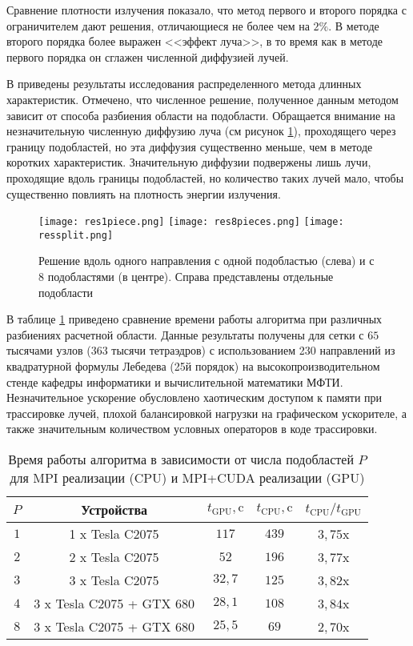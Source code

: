 Сравнение плотности излучения показало, что метод первого и второго порядка с ограничителем дают решения, отличающиеся не более чем на $2\%$. В методе второго порядка более выражен <<эффект луча>>, в то время как в методе первого порядка он сглажен численной диффузией лучей.

В  приведены результаты исследования распределенного метода длинных характеристик. Отмечено, что численное решение, полученное данным методом зависит от способа разбиения области на подобласти. Обращается внимание на незначительную численную диффузию луча (см рисунок \ref{fig:1vs8}), проходящего через границу подобластей, но эта диффузия существенно меньше, чем в методе коротких характеристик. Значительную диффузии подвержены лишь лучи, проходящие вдоль границы подобластей, но количество таких лучей мало, чтобы существенно повлиять на плотность энергии излучения.
\begin{figure}[ht!]
\centering
\texttt{[image: res1piece.png]} %
\texttt{[image: res8pieces.png]} %
\texttt{[image: ressplit.png]} %
\caption{Решение вдоль одного направления с одной подобластью (слева) и с 8 подобластями (в центре). Справа представлены отдельные подобласти}
\label{fig:1vs8}
\end{figure}

В таблице \ref{tab:speedup} приведено сравнение времени работы алгоритма при различных разбиениях расчетной области. Данные результаты получены для сетки с $65$ тысячами узлов ($363$ тысячи тетраэдров) с использованием 230 направлений из квадратурной формулы Лебедева (25й порядок) на высокопроизводительном стенде кафедры информатики и вычислительной математики МФТИ. Незначительное ускорение обусловлено хаотическим доступом к памяти при трассировке лучей, плохой балансировкой нагрузки на графическом ускорителе, а также значительным количеством условных операторов в коде трассировки.
\begin{table}[ht!]
\centering
    \begin{tabular}{|c|c|c|c|c|}
    \hline
    $P$ & Устройства & $t_\text{GPU}, \text{c}$ & $t_\text{CPU}, \text{c}$ & $t_\text{CPU} / t_\text{GPU}$\\\hline
    $1$& 1 x Tesla C2075 & $117$ & $439$ & $3,75$x\\\hline
    $2$& 2 x Tesla C2075 & $52$ & $196$ & $3,77$x\\\hline
    $3$& 3 x Tesla C2075 & $32,7$ & $125$ & $3,82$x\\\hline
    $4$& 3 x Tesla C2075 + GTX 680 & $28,1$ & $108$ & $3,84$x\\
	\hline
    $8$& 3 x Tesla C2075 + GTX 680 & $25,5$ & $69$ & $2,70$x\\\hline
    \end{tabular}
\caption{Время работы алгоритма в зависимости от числа подобластей $P$ для MPI реализации (CPU) и MPI+CUDA реализации (GPU)}
\label{tab:speedup}
\end{table}

